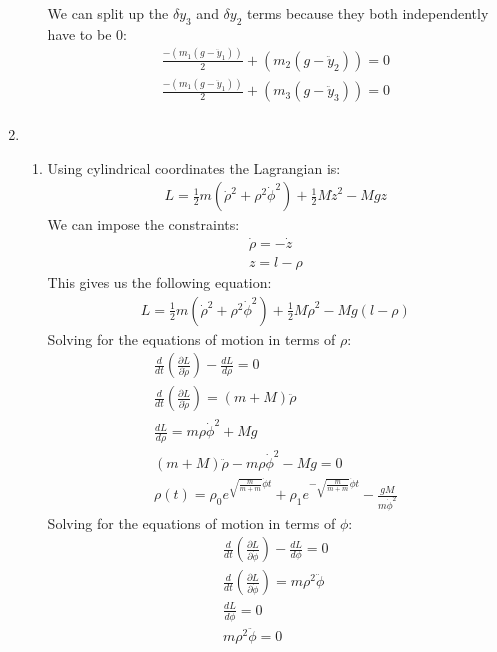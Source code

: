 \documentclass[12pt]{article}
\newcommand{\p}[2]{\frac{\partial #1}{\partial #2}}
\newcommand{\der}[2]{\frac{d #1}{d #2}}
\begin{document}
\begin{enumerate}
\begin{enumerate}
      We can split up the $\delta y_3$ and $\delta y_2$ terms because they both independently have to be 0:
      \begin{gather*}
        \frac{-(m_1 (g-\ddot{y}_1))}{2}+(m_2 (g-\ddot{y}_2))=0\\
        \frac{-(m_1 (g-\ddot{y}_1))}{2}+(m_3 (g-\ddot{y}_3))=0\\
      \end{gather*}
    \end{enumerate}
    \item
    \begin{enumerate}
      \item
      Using cylindrical coordinates the Lagrangian is:
      \begin{gather*}
        L=\frac{1}{2}m\left(\dot{\rho}^2+\rho^2\dot{\phi}^2\right)+\frac{1}{2}M\dot{z}^2-Mgz
      \end{gather*}
      We can impose the constraints:
      \begin{gather*}
        \dot{\rho}=-\dot{z}\\
        z=l-\rho
      \end{gather*}
      This gives us the following equation:
      \begin{gather*}
        L=\frac{1}{2}m\left(\dot{\rho}^2+\rho^2\dot{\phi}^2\right)+\frac{1}{2}M\dot{\rho}^2-Mg(l-\rho)
      \end{gather*}
      Solving for the equations of motion in terms of $\rho$:
      \begin{gather*}
        \frac{d}{dt}\left(\p{L}{\dot{\rho}}\right)-\der{L}{\rho}=0\\
        \frac{d}{dt}\left(\p{L}{\dot{\rho}}\right)=(m+M)\ddot{\rho}\\
        \der{L}{\rho}=m\rho\dot{\phi}^2+Mg\\
        (m+M)\ddot{\rho}-m\rho\dot{\phi}^2-Mg=0\\
        \rho(t)=\rho_0 e^{\sqrt{\frac{m}{m+m}}\dot{\phi} t}+\rho_1 e^{-\sqrt{\frac{m}{m+m}}\dot{\phi} t}-\frac{gM}{m\dot{\phi}^2}
      \end{gather*}
      Solving for the equations of motion in terms of $\phi$:
      \begin{gather*}
        \frac{d}{dt}\left(\p{L}{\dot{\phi}}\right)-\der{L}{\phi}=0\\
        \frac{d}{dt}\left(\p{L}{\dot{\phi}}\right)=m\rho^2\ddot{\phi}\\
        \der{L}{\phi}=0\\
        m\rho^2\ddot{\phi}=0\\

\end{gather*}
\end{enumerate}
\end{enumerate}
\end{document}
